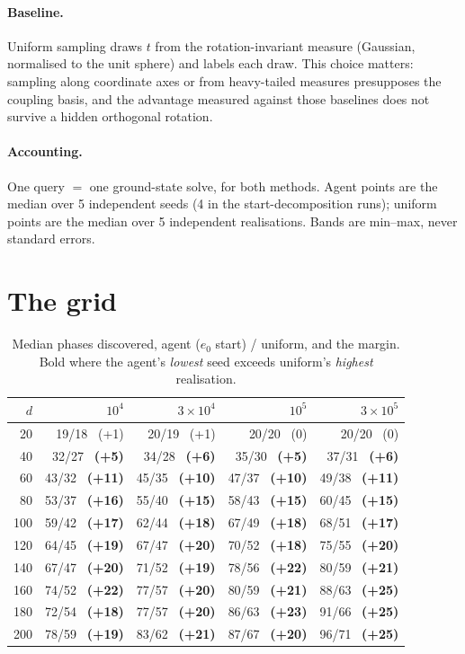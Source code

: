 \documentclass[11pt,a4paper]{article}
\begin{document}
\paragraph{Baseline.} Uniform sampling draws $t$ from the rotation-invariant measure
(Gaussian, normalised to the unit sphere) and labels each draw. This choice matters: sampling
along coordinate axes or from heavy-tailed measures presupposes the coupling basis, and the
advantage measured against those baselines does not survive a hidden orthogonal rotation.

\paragraph{Accounting.} One query $=$ one ground-state solve, for both methods. Agent points
are the median over 5 independent seeds (4 in the start-decomposition runs); uniform points are
the median over 5 independent realisations. Bands are min--max, never standard errors.

\section{The grid}

\begin{table}[h]\centering\small
\caption{Median phases discovered, agent ($e_0$ start) / uniform, and the margin. Bold where
the agent's \emph{lowest} seed exceeds uniform's \emph{highest} realisation.}
\begin{tabular}{r rrrr}
\toprule
$d$ & $10^4$ & $3\times10^4$ & $10^5$ & $3\times10^5$\\
\midrule
20 & 19/18 \ (+1) & 20/19 \ (+1) & 20/20 \ (0) & 20/20 \ (0)\\
40 & 32/27 \ \textbf{(+5)} & 34/28 \ \textbf{(+6)} & 35/30 \ \textbf{(+5)} & 37/31 \ \textbf{(+6)}\\
60 & 43/32 \ \textbf{(+11)} & 45/35 \ \textbf{(+10)} & 47/37 \ \textbf{(+10)} & 49/38 \ \textbf{(+11)}\\
80 & 53/37 \ \textbf{(+16)} & 55/40 \ \textbf{(+15)} & 58/43 \ \textbf{(+15)} & 60/45 \ \textbf{(+15)}\\
100 & 59/42 \ \textbf{(+17)} & 62/44 \ \textbf{(+18)} & 67/49 \ \textbf{(+18)} & 68/51 \ \textbf{(+17)}\\
120 & 64/45 \ \textbf{(+19)} & 67/47 \ \textbf{(+20)} & 70/52 \ \textbf{(+18)} & 75/55 \ \textbf{(+20)}\\
140 & 67/47 \ \textbf{(+20)} & 71/52 \ \textbf{(+19)} & 78/56 \ \textbf{(+22)} & 80/59 \ \textbf{(+21)}\\
160 & 74/52 \ \textbf{(+22)} & 77/57 \ \textbf{(+20)} & 80/59 \ \textbf{(+21)} & 88/63 \ \textbf{(+25)}\\
180 & 72/54 \ \textbf{(+18)} & 77/57 \ \textbf{(+20)} & 86/63 \ \textbf{(+23)} & 91/66 \ \textbf{(+25)}\\
200 & 78/59 \ \textbf{(+19)} & 83/62 \ \textbf{(+21)} & 87/67 \ \textbf{(+20)} & 96/71 \ \textbf{(+25)}\\
\bottomrule
\end{tabular}
\end{table}
\end{document}
